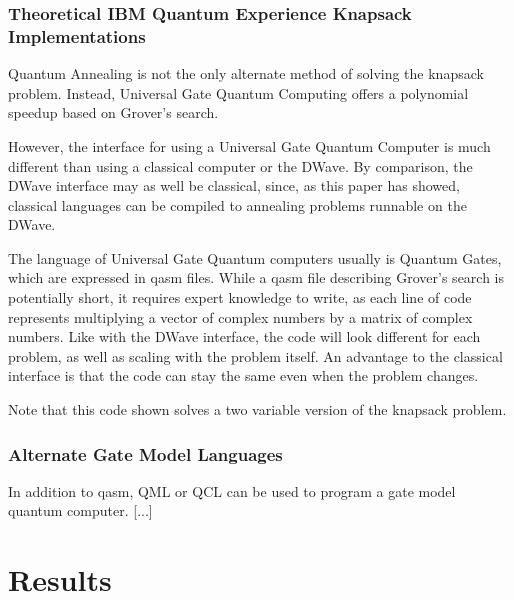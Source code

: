 \documentclass{article}
\begin{document}
\newpage

\subsubsection{Theoretical IBM Quantum Experience Knapsack Implementations}

Quantum Annealing is not the only alternate method of solving the knapsack problem.
Instead, Universal Gate Quantum Computing offers a polynomial speedup based on Grover's search.

However, the interface for using a Universal Gate Quantum Computer is much different than using a classical computer or the DWave.
By comparison, the DWave interface may as well be classical, since, as this paper has showed, classical languages can be compiled to annealing problems runnable on the DWave.

The language of Universal Gate Quantum computers usually is Quantum Gates, which are expressed in qasm files.
While a qasm file describing Grover's search is potentially short, it requires expert knowledge to write, as each line of code represents multiplying a vector of complex numbers by a matrix of complex numbers.
Like with the DWave interface, the code will look different for each problem, as well as scaling with the problem itself.
An advantage to the classical interface is that the code can stay the same even when the problem changes.       

Note that this code shown solves a two variable version of the knapsack problem.

\lstset{language=C}


\subsubsection{Alternate Gate Model Languages}

In addition to qasm, QML or QCL can be used to program a gate model quantum computer.
[...]

\section{Results}
\end{document}
